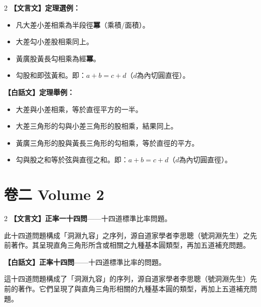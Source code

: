 \documentclass[11pt,a4paper]{article}
\begin{document}
\begin{paracol}{2}
\textbf{【文言文】}\textbf{定理選例：}

\begin{itemize}[leftmargin=1.5em]
\item 凡大差小差相乘為半段徑\textbf{冪}（乘積/面積）。
\item 大差勾小差股相乘同上。
\item 黃廣股黃長勾相乘為經\textbf{冪}。
\item 勾股和即弦黃和。\newline 即：$a + b = c + d$（$d$為內切圓直徑）。
\end{itemize}

\switchcolumn
\textbf{【白話文】}\textbf{定理舉例：}

\begin{itemize}[leftmargin=1.5em]
\item 大差與小差相乘，等於直徑平方的一半。
\item 大差三角形的勾與小差三角形的股相乘，結果同上。
\item 黃廣三角形的股與黃長三角形的勾相乘，等於直徑的平方。
\item 勾與股之和等於弦與直徑之和。\newline 即：$a + b = c + d$（$d$為內切圓直徑）。
\end{itemize}
\end{paracol}

\newpage

\section{卷二 \quad Volume 2}
\label{sec:vol2}

\begin{paracol}{2}
\textbf{【文言文】}\textbf{正率一十四問}——十四道標準比率問題。

此十四道問題構成「洞淵九容」之序列，源自道家學者李思聰（號洞淵先生）之先前著作。其呈現直角三角形所含或相關之九種基本圓類型，再加五道補充問題。

\switchcolumn
\textbf{【白話文】}\textbf{正率十四問}——十四道標準比率的問題。

這十四道問題構成了「洞淵九容」的序列，源自道家學者李思聰（號洞淵先生）先前的著作。它們呈現了與直角三角形相關的九種基本圓的類型，再加上五道補充問題。
\end{paracol}
\end{document}
